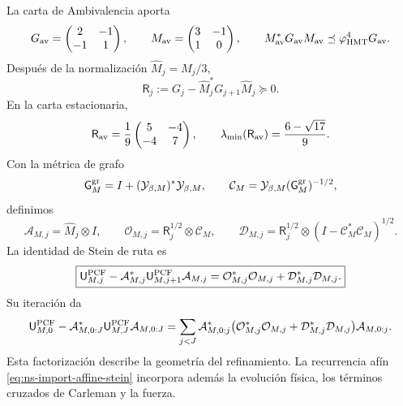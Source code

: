 La carta de Ambivalencia aporta
\begin{equation}
 G_{\rm av}=\begin{pmatrix}2&-1\\-1&1\end{pmatrix},
 \qquad
 M_{\rm av}=\begin{pmatrix}3&-1\\1&0\end{pmatrix},
 \qquad
 M_{\rm av}^*G_{\rm av}M_{\rm av}
 \preceq\varphi_{\rm HMT}^4G_{\rm av}.
 \label{eq:nsclose-ambivalence-route-metric}
\end{equation}
Después de la normalización \(\widehat M_j=M_j/3\),
\begin{equation}
 \mathsf R_j:=G_j-\widehat M_j^*G_{j+1}\widehat M_j\succeq0.
 \label{eq:nsclose-route-exact-defect}
\end{equation}
En la carta estacionaria,
\[
 \mathsf R_{\rm av}
 =\frac19\begin{pmatrix}5&-4\\-4&7\end{pmatrix},
 \qquad
 \lambda_{\min}(\mathsf R_{\rm av})
 =\frac{6-\sqrt{17}}9.
\]
Con la métrica de grafo
\[
 \mathsf G_M^{\rm gr}
 =I+(\mathcal Y_{\beta,M})^*\mathcal Y_{\beta,M},
 \qquad
 \mathcal C_M
 =\mathcal Y_{\beta,M}(\mathsf G_M^{\rm gr})^{-1/2},
\]
definimos
\begin{equation}
 \mathcal A_{M,j}=\widehat M_j\otimes I,
 \qquad
 \mathcal O_{M,j}=\mathsf R_j^{1/2}\otimes\mathcal C_M,
 \qquad
 \mathcal D_{M,j}
 =\mathsf R_j^{1/2}\otimes(I-\mathcal C_M^*\mathcal C_M)^{1/2}.
 \label{eq:nsclose-owner-route-column}
\end{equation}
La identidad de Stein de ruta es
\begin{equation}
 \boxed{
 \mathsf U_{M,j}^{\rm PCF}
 -\mathcal A_{M,j}^*\mathsf U_{M,j+1}^{\rm PCF}\mathcal A_{M,j}
 =\mathcal O_{M,j}^*\mathcal O_{M,j}
  +\mathcal D_{M,j}^*\mathcal D_{M,j}.}
 \label{eq:nsclose-owner-stein}
\end{equation}
Su iteración da
\begin{equation}
 \begin{aligned}
 \mathsf U_{M,0}^{\rm PCF}
 -\mathcal A_{M,0:J}^*\mathsf U_{M,J}^{\rm PCF}\mathcal A_{M,0:J}
 =\sum_{j<J}\mathcal A_{M,0:j}^*
 \bigl(\mathcal O_{M,j}^*\mathcal O_{M,j}
      +\mathcal D_{M,j}^*\mathcal D_{M,j}\bigr)
 \mathcal A_{M,0:j}.
 \end{aligned}
 \label{eq:nsclose-owner-stein-telescope}
\end{equation}
Esta factorización describe la geometría del refinamiento. La recurrencia
afín \eqref{eq:ns-import-affine-stein} incorpora además la evolución física,
los términos cruzados de Carleman y la fuerza.

